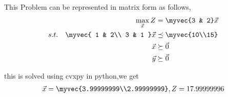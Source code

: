     This Problem can be represented in matrix form as follows,\\
    \begin{align}
        \max_{\vec{x}} Z &= \myvec{3 & 2}\vec{x}\\
        s.t. \quad 
        \myvec{
        1 & 2\\
        3 & 1
        }
        \vec{x} &\preceq \myvec{10\\15} \\
        \vec{x} &\succeq \vec{0}\\
        \vec{y} &\succeq \vec{0}
    \end{align}
    
    this is solved using cvxpy in python,we get \\
    \begin{align}
    \vec{x} = \myvec{3.99999999\\2.99999999}, Z = 17.99999996
    \end{align}

